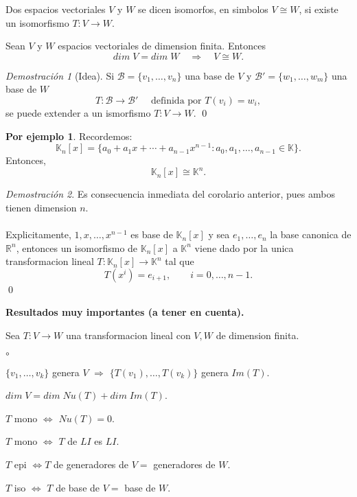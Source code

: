 \documentclass{article}
\theoremstyle{definition}
\theoremstyle{definition}
\newtheorem*{ej}{Por ejemplo}
\theoremstyle{remark}
\newtheorem*{demo}{Demostración}
\begin{document}
\begin{defi}
  Dos espacios vectoriales $V$ y $W$ se dicen isomorfos, en simbolos $V \cong W$, si existe un isomorfismo $T : V \to W$. 
\end{defi}
\begin{corol}[Teorema 65]
  Sean $V$ y $W$ espacios vectoriales de dimension finita. Entonces \[
dim \; V = dim\; W \quad \Rightarrow \quad V \cong W.
  \]
\end{corol}
\begin{demo}[Idea] Si $\mathcal{B}=\{v_1, \dots ,v_n\}$ una base de $V$ y $\mathcal{B}'=\{w_1,\dots ,w_m\}$ una base de $W$ \[
  T: \mathcal{B} \to \mathcal{B}' \quad \text{ definida por } T(v_i)=w_i,
\]
se puede extender a un ismorfismo $T : V \to W$. \qed
\end{demo}
\begin{ej}
Recordemos: \[
  \mathbb{K}_{n}[x]=\{a_{0}+a_{1}x+\cdots + a_{n-1}x^{n-1}: a_{0},a_1,\dots,a_{n-1} \in \mathbb{K}\}.
\]
Entonces, \[
  \mathbb{K}_{n}[x]\cong \mathbb{K}^{n}.
\]
\end{ej}
\begin{demo}
  Es consecuencia inmediata del corolario anterior, pues ambos tienen dimension $n$. \\\\ Explicitamente, $1, x, \dots , x^{n-1}$ es base de $\mathbb{K}_{n}[x]$ y sea $e_1, \dots ,e_n$ la base canonica de $\mathbb{R}^n$, entonces un isomorfismo de $\mathbb{K}_n[x]$ a $\mathbb{K}^n$ viene dado por la unica transformacion lineal $T : \mathbb{K}_n[x] \to \mathbb{K}^n $ tal que \[
    T(x^i)=e_{i+1}, \quad \quad i=0,\dots ,n-1.
  \] \qed
\end{demo}
\pagebreak
\begin{center}
\textbf{Resultados muy importantes (a tener en cuenta).}
\end{center}
Sea $T : V \to W$ una transformacion lineal con $V, W$ de dimension finita. 
\begin{list}{$\circ$}{}  
\item   $\{v_1, \dots ,v_k\}$ genera $V$ $\Rightarrow$ $\{T(v_1),\dots ,T(v_k)\}$ genera $Im(T)$.
\item $dim\; V = dim \; Nu(T)+dim \; Im(T)$. 
\item $T$ mono $\Leftrightarrow$ $Nu(T)=0$. 
\item $T$ mono $\Leftrightarrow$ $T$ de $LI$ es $LI$.
\item $T$ epi $\Leftrightarrow T$ de generadores de $V = $ generadores de $W$.
\item $T$ iso $\Leftrightarrow$ $T$ de base de $V = $ base de $W$.
 \end{list}
\end{document}
